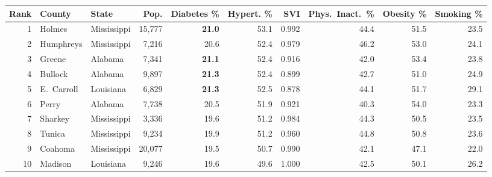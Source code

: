 \documentclass[10pt,letterpaper]{article}
\begin{document}
\renewcommand{\arraystretch}{1.2}
\small
\begin{tabularx}{\textwidth}{@{} r l l r r r r r r r @{}}
\toprule
\textbf{Rank} &
\textbf{County} &
\textbf{State} &
\textbf{Pop.} &
\textbf{Diabetes \%} &
\textbf{Hypert. \%} &
\textbf{SVI} &
\textbf{Phys.\ Inact.\ \%} &
\textbf{Obesity \%} &
\textbf{Smoking \%} \\
\midrule
\rowcolor{critred!18}
1 & Holmes     & Mississippi &  15{,}777 & \textbf{21.0} & 53.1 & 0.992 & 44.4 & 51.5 & 23.5 \\
2 & Humphreys  & Mississippi &   7{,}216 & 20.6 & 52.4 & 0.979 & 46.2 & 53.0 & 24.1 \\
\rowcolor{rowalt}
3 & Greene     & Alabama     &   7{,}341 & \textbf{21.1} & 52.4 & 0.916 & 42.0 & 53.4 & 23.8 \\
4 & Bullock    & Alabama     &   9{,}897 & \textbf{21.3} & 52.4 & 0.899 & 42.7 & 51.0 & 24.9 \\
\rowcolor{rowalt}
5 & E.\ Carroll & Louisiana &   6{,}829 & \textbf{21.3} & 52.5 & 0.878 & 44.1 & 51.7 & 29.1 \\
6 & Perry      & Alabama     &   7{,}738 & 20.5 & 51.9 & 0.921 & 40.3 & 54.0 & 23.3 \\
\rowcolor{rowalt}
7 & Sharkey    & Mississippi &   3{,}336 & 19.6 & 51.2 & 0.984 & 44.3 & 50.5 & 23.5 \\
8 & Tunica     & Mississippi &   9{,}234 & 19.9 & 51.2 & 0.960 & 44.8 & 50.8 & 23.6 \\
\rowcolor{rowalt}
9 & Coahoma    & Mississippi &  20{,}077 & 19.5 & 50.7 & 0.990 & 42.1 & 47.1 & 22.0 \\
10 & Madison   & Louisiana   &   9{,}246 & 19.6 & 49.6 & 1.000 & 42.5 & 50.1 & 26.2 \\
\bottomrule
\end{tabularx}

\vspace{3pt}
\end{document}
